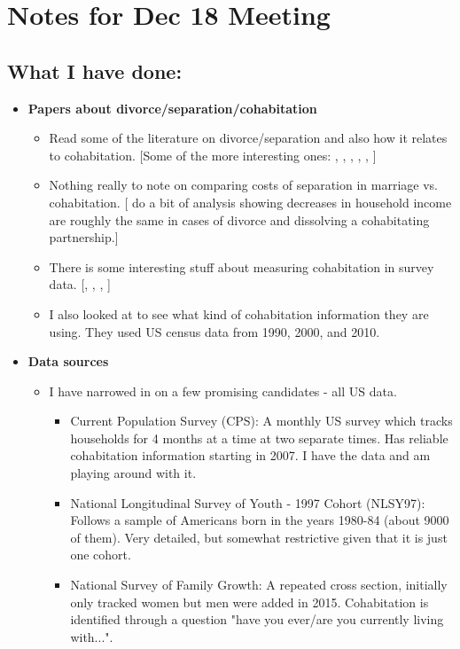 \documentclass{article}
\begin{document}

\section*{Notes for Dec 18 Meeting}
\subsection*{What I have done:}

\begin{itemize}
\item \textbf{Papers about divorce/separation/cohabitation}
\begin{itemize}
\item Read some of the literature on divorce/separation and also how it relates to cohabitation. [Some of the more interesting ones: \citet{weiss1997match}, \citet{brien2006cohabitation}, \citet{matouschek2008economics}, \citet{kulu2010premarital}, \citet{lundberg2016family}, \citet{folke2020all}] 

\item Nothing really to note on comparing costs of separation in marriage vs. cohabitation. [\citet{tach2015trends} do a bit of analysis showing decreases in household income are roughly the same in cases of divorce and dissolving a cohabitating partnership.]

\item There is some interesting stuff about measuring cohabitation in survey data. [\citet{manning2005measuring}, \citet{fitch2005rise}, \citet{kennedy2012measuring}, \citet{manning2019measuring}]

\item I also looked at \citet{mourifie2021cobb} to see what kind of cohabitation information they are using. They used US census data from 1990, 2000, and 2010. 

\end{itemize}

\item \textbf{Data sources}
\begin{itemize}
\item I have narrowed in on a few promising candidates - all US data.
\begin{itemize}
\item Current Population Survey (CPS): A monthly US survey which tracks households for 4 months at a time at two separate times. Has reliable cohabitation information starting in 2007. I have the data and am playing around with it.
\item National Longitudinal Survey of Youth - 1997 Cohort (NLSY97): Follows a sample of Americans born in the years 1980-84 (about 9000 of them). Very detailed, but somewhat restrictive given that it is just one cohort.
\item National Survey of Family Growth: A repeated cross section, initially only tracked women but men were added in 2015. Cohabitation is identified through a question "have you ever/are you currently living with...".
\end{itemize}
\end{itemize}



\end{itemize}
\end{document}
